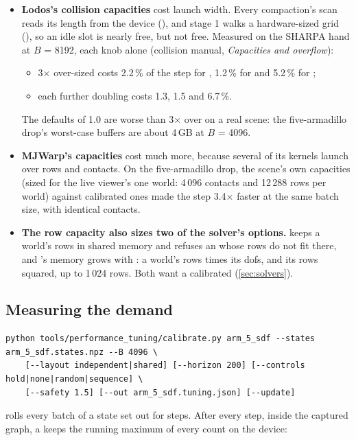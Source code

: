 \begin{itemize}
\item \textbf{Lodos's collision capacities} cost launch width. Every compaction's scan reads its length from the device (), and stage 1 walks a hardware-sized grid (), so an idle slot is nearly free, but not free. Measured on the SHARPA hand at $B$ = 8192, each knob alone (collision manual, \emph{Capacities and overflow}):
  \begin{itemize}
  \item 3$\times$ over-sized costs 2.2\,\% of the step for , 1.2\,\% for  and 5.2\,\% for ;
  \item each further doubling costs 1.3, 1.5 and 6.7\,\%.
  \end{itemize}
  The defaults of 1.0 are worse than 3$\times$ over on a real scene: the five-armadillo drop's worst-case buffers are about 4\,GB at $B$ = 4096.
\item \textbf{MJWarp's capacities} cost much more, because several of its kernels launch over  rows and  contacts. On the five-armadillo drop, the scene's own capacities (sized for the live viewer's one world: 4\,096 contacts and 12\,288 rows per world) against calibrated ones made the step 3.4$\times$ faster at the same batch size, with identical contacts.
\item \textbf{The row capacity also sizes two of the solver's options.}  keeps a world's rows in shared memory and refuses an  whose rows do not fit there, and 's memory grows with : a world's rows times its dofs, and its rows squared, up to 1\,024 rows. Both want a calibrated  (\cref{sec:solvers}).
\end{itemize}

\subsection{Measuring the demand}\label{sec:calibrate}

\begin{lstlisting}
python tools/performance_tuning/calibrate.py arm_5_sdf --states arm_5_sdf.states.npz --B 4096 \
    [--layout independent|shared] [--horizon 200] [--controls hold|none|random|sequence] \
    [--safety 1.5] [--out arm_5_sdf.tuning.json] [--update]
\end{lstlisting}

 rolls every batch of a state set out for  steps. After every step, inside the captured graph, a  keeps the running maximum of every count on the device:

